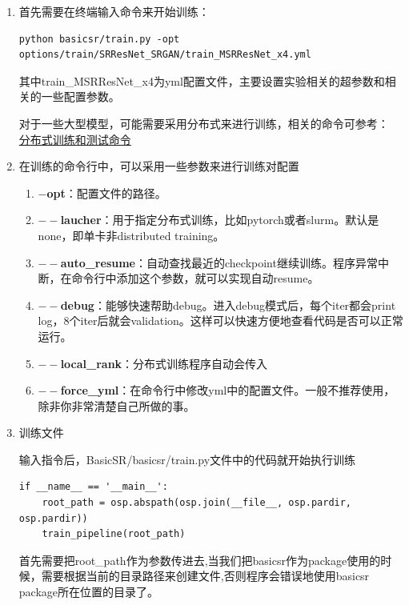 \documentclass[../main.tex]{subfiles}
\begin{document}
\begin{enumerate}
    \item 首先需要在终端输入命令来开始训练：

\begin{verbatim}
python basicsr/train.py -opt options/train/SRResNet_SRGAN/train_MSRResNet_x4.yml
\end{verbatim}

    其中train\_MSRResNet\_x4为yml配置文件，主要设置实验相关的超参数和相关的一些配置参数。

    对于一些大型模型，可能需要采用分布式来进行训练，相关的命令可参考：
    \href{https://github.com/XPixelGroup/BasicSR/blob/master/docs/TrainTest.md}{分布式训练和测试命令}

    \item 在训练的命令行中，可以采用一些参数来进行训练对配置

    \begin{enumerate}
    \item \textbf{$-$opt}：配置文件的路径。
    \item \textbf{$--$laucher}：用于指定分布式训练，比如pytorch或者slurm。默认是none，即单卡非distributed training。
    \item \textbf{$--$auto\_resume}：自动查找最近的checkpoint继续训练。程序异常中断，在命令行中添加这个参数，就可以实现自动resume。
    \item \textbf{$--$debug}：能够快速帮助debug。进入debug模式后，每个iter都会print log，8个iter后就会validation。这样可以快速方便地查看代码是否可以正常运行。
    \item \textbf{$--$local\_rank}：分布式训练程序自动会传入
    \item \textbf{$--$force\_yml}：在命令行中修改yml中的配置文件。一般不推荐使用，除非你非常清楚自己所做的事。
    \end{enumerate}

\item 训练文件

输入指令后，BasicSR/basicsr/train.py文件中的代码就开始执行训练
\begin{verbatim}
if __name__ == '__main__':
    root_path = osp.abspath(osp.join(__file__, osp.pardir, osp.pardir))
    train_pipeline(root_path)
\end{verbatim}
首先需要把root\_path作为参数传进去,当我们把basicsr作为package使用的时候，需要根据当前的目录路径来创建文件,否则程序会错误地使用basicsr package所在位置的目录了。


\end{enumerate}
\end{document}
